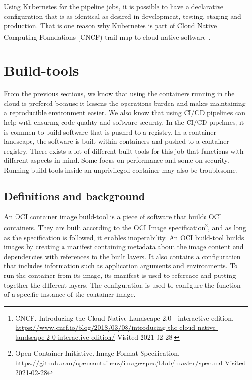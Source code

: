 Using Kubernetes for the pipeline jobs, it is possible to have a declarative configuration that is as identical as desired in development, testing, staging and production. That is one reason why Kubernetes is part of Cloud Native Computing Foundations (CNCF) trail map to cloud-native software\footnote{CNCF. Introducing the Cloud Native Landscape 2.0 - interactive edition. \url{https://www.cncf.io/blog/2018/03/08/introducing-the-cloud-native-landscape-2-0-interactive-edition/} Visited 2021-02-28.}. 


\section{Build-tools} %
From the previous sections, we know that using the containers running in the cloud is prefered because it lessens the operations burden and makes maintaining a reproducible environment easier. We also know that using CI/CD pipelines can help with ensuring code quality and software security. In the CI/CD pipelines, it is common to build software that is pushed to a registry. In a container landscape, the software is built within containers and pushed to a container registry. There exists a lot of different built-tools for this job that functions with different aspects in mind. Some focus on performance and some on security. Running build-tools inside an unprivileged container may also be troublesome. 
\subsection{Definitions and background}
An OCI container image build-tool is a piece of software that builds OCI containers. They are built according to the OCI Image specification\footnote{Open Container Initiative. Image Format Specification. \url{https://github.com/opencontainers/image-spec/blob/master/spec.md} Visited 2021-02-28}, and as long as the specification is followed, it enables inoperability. An OCI build-tool builds images by creating a manifest containing metadata about the image content and dependencies with references to the built layers. It also contains a configuration that includes information such as application arguments and environments. To run the container from its image, its manifest is used to reference and putting together the different layers. The configuration is used to configure the function of a specific instance of the container image. 

